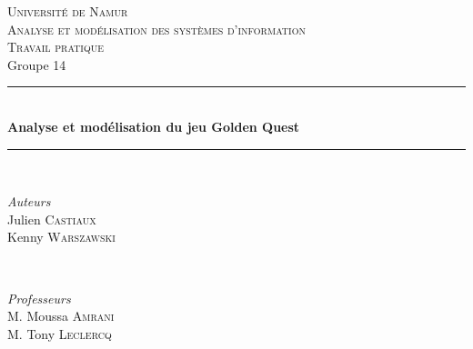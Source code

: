 \documentclass[11pt]{article}
\begin{document}

\begin{titlepage} %
	\newcommand{\HRule}{\rule{\linewidth}{0.5mm}} %
	
	\center %
	
	
	\textsc{\LARGE Université de Namur}\\[1.5cm] %
	
	\textsc{\Large Analyse et modélisation des systèmes d'information}\\[0.5cm] %
	
	\textsc{\large Travail pratique}\\Groupe 14\\[0.5cm] %
	
	
	\HRule\\[0.4cm]
	
	{\huge\bfseries Analyse et modélisation du jeu Golden Quest}\\[0.4cm] %
	
	\HRule\\[1.5cm]
	
	
	\begin{minipage}{0.4\textwidth}
		\begin{flushleft}
			\textit{Auteurs}\\
			\large Julien \textsc{Castiaux}
			\\
			\large Kenny \textsc{Warszawski}
		\end{flushleft}

	\end{minipage}
	~
	\begin{minipage}{0.4\textwidth}
		\begin{flushright}
			\large
			\textit{Professeurs}\\
			M. Moussa \textsc{Amrani}\\
			M. Tony \textsc{Leclercq}
		\end{flushright}
	\end{minipage}
	

\end{titlepage}
\end{document}
